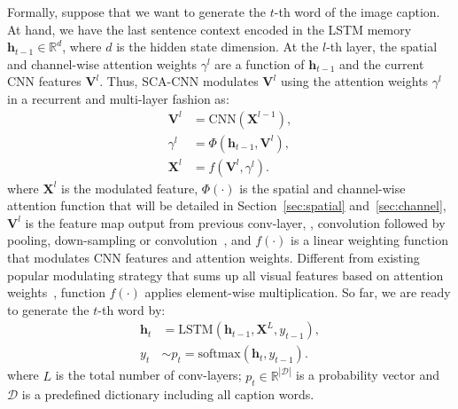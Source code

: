 \documentclass[10pt,twocolumn,letterpaper]{article}
\begin{document}
Formally, suppose that we want to generate the $t$-th word of the image caption. At hand, we have the last sentence context encoded in the LSTM memory
$\mathbf{h}_{t-1}\in\mathbb{R}^d$, where $d$ is the hidden state dimension. At the $l$-th layer, the spatial and channel-wise attention weights $\gamma^l$ are
a function of $\mathbf{h}_{t-1}$ and the current CNN features $\mathbf{V}^l$. Thus, SCA-CNN modulates $\mathbf{V}^l$ using the attention weights $\gamma^l$ in
a recurrent and multi-layer fashion as:
\begin{equation} \label{equ:whole_attention}
\begin{split}
\mathbf{V}^l &= \textrm{CNN}\left(\mathbf{X}^{l-1}\right),\\
\gamma^l &= \Phi\left(\mathbf{h}_{t-1},\mathbf{V}^l\right),\\
\mathbf{X}^l &= f\left(\mathbf{V}^{l},\gamma^{l}\right).
\end{split}
\end{equation}
where $\mathbf{X}^l$ is the modulated feature, $\Phi(\cdot)$ is the spatial and channel-wise attention function that will be detailed in
Section~\ref{sec:spatial} and~\ref{sec:channel}, $\mathbf{V}^l$ is the feature map output from previous conv-layer, \eg, convolution followed by pooling,
down-sampling or convolution~\cite{simonyan2014very,he2015deep}, and $f(\cdot)$ is a linear weighting function that modulates CNN features and attention
weights. Different from existing popular modulating strategy that sums up all visual features based on attention weights~\cite{xu2015show}, function
$f(\cdot)$ applies element-wise multiplication.
So far, we are ready to generate the $t$-th word by:
\begin{equation}
\begin{split}
\mathbf{h}_t &= \textrm{LSTM}\left(\mathbf{h}_{t-1},\mathbf{X}^L,y_{t-1}\right),\\
y_t & \sim p_t = \textrm{softmax} \left(\mathbf{h}_t, y_{t-1} \right).
\end{split}
\end{equation}
where $L$  is the total number of conv-layers; $p_t \in \mathbb{R}^{|\mathcal{D}|}$ is a probability vector and $\mathcal{D}$ is a predefined dictionary
including all caption words.
\end{document}
